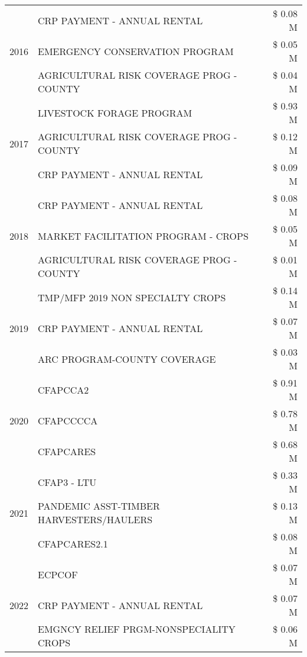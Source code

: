 \begin{tabular}{llr}
\cline{1-3}
\multirow[t]{3}{*}{2016} & CRP PAYMENT - ANNUAL RENTAL & \$ 0.08 M \\
 & EMERGENCY CONSERVATION PROGRAM & \$ 0.05 M \\
 & AGRICULTURAL RISK COVERAGE PROG - COUNTY & \$ 0.04 M \\
\cline{1-3}
\multirow[t]{3}{*}{2017} & LIVESTOCK FORAGE PROGRAM & \$ 0.93 M \\
 & AGRICULTURAL RISK COVERAGE PROG - COUNTY & \$ 0.12 M \\
 & CRP PAYMENT - ANNUAL RENTAL & \$ 0.09 M \\
\cline{1-3}
\multirow[t]{3}{*}{2018} & CRP PAYMENT - ANNUAL RENTAL & \$ 0.08 M \\
 & MARKET FACILITATION PROGRAM - CROPS & \$ 0.05 M \\
 & AGRICULTURAL RISK COVERAGE PROG - COUNTY & \$ 0.01 M \\
\cline{1-3}
\multirow[t]{3}{*}{2019} & TMP/MFP 2019 NON SPECIALTY CROPS & \$ 0.14 M \\
 & CRP PAYMENT - ANNUAL RENTAL & \$ 0.07 M \\
 & ARC PROGRAM-COUNTY COVERAGE & \$ 0.03 M \\
\cline{1-3}
\multirow[t]{3}{*}{2020} & CFAPCCA2 & \$ 0.91 M \\
 & CFAPCCCCA & \$ 0.78 M \\
 & CFAPCARES & \$ 0.68 M \\
\cline{1-3}
\multirow[t]{3}{*}{2021} & CFAP3 - LTU & \$ 0.33 M \\
 & PANDEMIC ASST-TIMBER HARVESTERS/HAULERS & \$ 0.13 M \\
 & CFAPCARES2.1 & \$ 0.08 M \\
\cline{1-3}
\multirow[t]{3}{*}{2022} & ECPCOF & \$ 0.07 M \\
 & CRP PAYMENT - ANNUAL RENTAL & \$ 0.07 M \\
 & EMGNCY RELIEF PRGM-NONSPECIALITY CROPS & \$ 0.06 M \\
\cline{1-3}
\bottomrule
\end{tabular}
